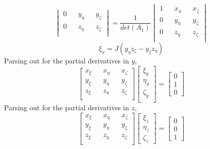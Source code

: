 \documentclass[a4paper, 12pt]{report}
\begin{document}
\begin{center}
$$\begin{vmatrix}
0 && y_{\eta} && y_{\zeta} \\
0 && z_{\eta} && z_{\zeta} \\
\end{vmatrix} = \frac{1}{det(A_{1})}\begin{vmatrix}
1 && x_{\eta} && x_{\zeta} \\
0 && y_{\eta} && y_{\zeta} \\
0 && z_{\eta} && z_{\zeta} \\
\end{vmatrix}$$
$$\xi_{x} = J(y_{\eta}z_{\zeta} - y_{\zeta}z_{\eta})$$
Parsing out for the partial derivatives in $y$,
$$\begin{bmatrix}
x_{\xi} && x_{\eta} && x_{\zeta} \\
y_{\xi} && y_{\eta} && y_{\zeta} \\
z_{\xi} && z_{\eta} && z_{\zeta} \\
\end{bmatrix}\begin{bmatrix}
\xi_{y} \\
\eta_{y} \\
\zeta_{y} \\
\end{bmatrix} = \begin{bmatrix}
0 \\
1 \\
0
\end{bmatrix}$$
Parsing out for the partial derivatives in $z$,
$$\begin{bmatrix}
x_{\xi} && x_{\eta} && x_{\zeta} \\
y_{\xi} && y_{\eta} && y_{\zeta} \\
z_{\xi} && z_{\eta} && z_{\zeta} \\
\end{bmatrix}\begin{bmatrix}
\xi_{z} \\
\eta_{z} \\
\zeta_{z} 
\end{bmatrix} = \begin{bmatrix}
0 \\
0 \\
1
\end{bmatrix}$$



\end{center}
\end{document}
